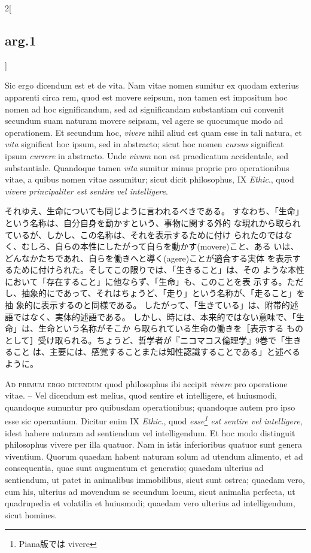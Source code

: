 \documentclass[paper=a4paper,fontsize=10pt,jafontsize=9pt,titlepage]{jlreq}
\begin{document}
\begin{paracol}{2}[\subsection{arg.1}]
\switchcolumn*


Sic ergo dicendum est et de vita. Nam vitae nomen sumitur ex quodam
 exterius apparenti circa rem, quod est movere seipsum, non tamen est
 impositum hoc nomen ad hoc significandum, sed ad significandam
 substantiam cui convenit secundum suam naturam movere seipsam, vel
 agere se quocumque modo ad operationem. Et secundum hoc, {\itshape
 vivere} nihil aliud est quam esse in tali natura, et {\itshape vita}
 significat hoc ipsum, sed in abstracto; sicut hoc nomen {\itshape
 cursus} significat ipsum {\itshape currere} in abstracto. Unde
 {\itshape vivum} non est praedicatum accidentale, sed
 substantiale. Quandoque tamen {\itshape vita} sumitur minus proprie pro
 operationibus vitae, a quibus nomen vitae assumitur; sicut dicit
 philosophus, IX {\itshape Ethic}., quod {\itshape vivere principaliter
 est sentire vel intelligere}.

\switchcolumn

それゆえ、生命についても同じように言われるべきである。
すなわち、「生命」という名称は、自分自身を動かすという、事物に関する外的
 な現れから取られているが、しかし、この名称は、それを表示するために付け
 られたのではなく、むしろ、自らの本性にしたがって自らを動かす(movere)こと、ある
 いは、どんなかたちであれ、自らを働きへと導く(agere)ことが適合する実体
 を表示するために付けられた。そしてこの限りでは、「生きること」は、その
 ような本性において「存在すること」に他ならず、「生命」も、このことを表
 示する。ただし、抽象的にであって、それはちょうど、「走り」という名称が、「走ること」を抽
 象的に表示するのと同様である。
したがって、「生きている」は、附帯的述語ではなく、実体的述語である。
しかし、時には、本来的ではない意味で、「生命」は、生命という名称がそこか
 ら取られている生命の働きを［表示する
 ものとして］受け取られる。ちょうど、哲学者が『ニコマコス倫理学』9巻で「生きること
 は、主要には、感覚することまたは知性認識することである」と述べるように。

\switchcolumn*[\subsection{ad.1}]


{\scshape Ad primum ergo dicendum} quod philosophus ibi accipit {\itshape vivere}
 pro operatione vitae. -- Vel dicendum est melius, quod sentire et
 intelligere, et huiusmodi, quandoque sumuntur pro quibusdam
 operationibus; quandoque autem pro ipso esse sic operantium. Dicitur
 enim IX {\itshape Ethic}., quod {\itshape esse\footnote{Piana版では vivere} est sentire vel intelligere}, idest habere
 naturam ad sentiendum vel intelligendum. Et hoc modo distinguit
 philosophus vivere per illa quatuor. Nam in istis inferioribus quatuor
 sunt genera viventium. Quorum quaedam habent naturam solum ad utendum
 alimento, et ad consequentia, quae sunt augmentum et generatio; quaedam
 ulterius ad sentiendum, ut patet in animalibus immobilibus, sicut sunt
 ostrea; quaedam vero, cum his, ulterius ad movendum se secundum locum,
 sicut animalia perfecta, ut quadrupedia et volatilia et huiusmodi;
 quaedam vero ulterius ad intelligendum, sicut homines.


\end{paracol}
\end{document}

